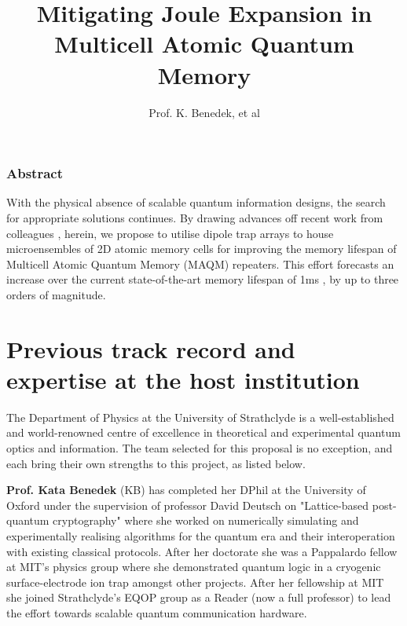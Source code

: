 \documentclass{epsrc}
\begin{document}
\title{Mitigating Joule Expansion in Multicell Atomic Quantum Memory}

\author{Prof. K. Benedek, et al}
\maketitle

\vspace{8pt}

\section{Abstract}

With the physical absence of scalable quantum information designs, the search for appropriate solutions continues. By drawing advances off recent work from colleagues , herein, we propose to utilise dipole trap arrays  to house microensembles of 2D atomic memory cells for improving the memory lifespan of Multicell Atomic Quantum Memory (MAQM) repeaters. This effort forecasts an increase over the current state-of-the-art memory lifespan of 1ms , by up to three orders of magnitude. 

\part{Previous track record and expertise at the host institution}

The Department of Physics at the University of Strathclyde is a well-established and world-renowned centre of excellence in theoretical and experimental quantum optics and information. The team selected for this proposal is no exception, and each bring their own strengths to this project, as listed below.

\vspace{8pt}

\textbf{Prof. Kata Benedek} (KB) has completed her DPhil at the University of Oxford under the supervision of professor David Deutsch on "Lattice-based post-quantum cryptography" where she worked on numerically simulating and experimentally realising algorithms for the quantum era and their interoperation with existing classical protocols. After her doctorate she was a Pappalardo fellow at MIT's physics group where she demonstrated quantum logic in a cryogenic surface-electrode ion trap  amongst other projects. After her fellowship at MIT she joined Strathclyde's EQOP group as a Reader (now a full professor) to lead the effort towards scalable quantum communication hardware. 
\end{document}

